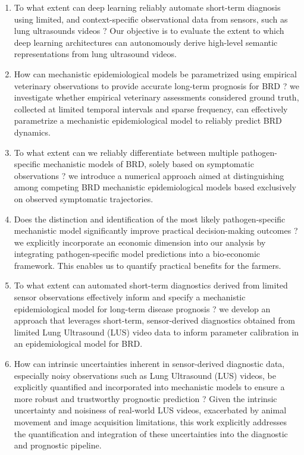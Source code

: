 \begin{enumerate}
    \item To what extent can deep learning reliably automate short-term diagnosis using limited, and context-specific observational data from sensors, such as lung ultrasounds videos ? Our objective is to evaluate the extent to which deep learning architectures can autonomously derive high-level semantic representations from lung ultrasound videos.
    
    \item How can mechanistic epidemiological models be parametrized using empirical veterinary observations to provide accurate long-term prognosis for BRD ?  we investigate whether empirical veterinary assessments considered ground truth, collected at limited temporal intervals and sparse frequency, can effectively parametrize a mechanistic epidemiological model to reliably predict BRD dynamics. 

    \item To what extent can we reliably differentiate between multiple pathogen-specific mechanistic models of BRD, solely based on symptomatic observations ? we introduce a numerical approach aimed at distinguishing among competing BRD mechanistic epidemiological models based exclusively on observed symptomatic trajectories. 

    \item Does the distinction and identification of the most likely pathogen-specific mechanistic model significantly improve practical decision-making outcomes ? we explicitly incorporate an economic dimension into our analysis by integrating pathogen-specific model predictions into a bio-economic framework. This enables us to quantify practical benefits for the farmers. 

    \item To what extent can automated short-term diagnostics derived from limited sensor observations effectively inform and specify a mechanistic epidemiological model for long-term disease prognosis ? we develop an approach that leverages short-term, sensor-derived diagnostics obtained from limited Lung Ultrasound (LUS) video data to inform parameter calibration in an epidemiological model for BRD. 

    \item How can intrinsic uncertainties inherent in sensor-derived diagnostic data, especially noisy observations such as Lung Ultrasound (LUS) videos, be explicitly quantified and incorporated into mechanistic models to ensure a more robust and trustworthy prognostic prediction ? Given the intrinsic uncertainty and noisiness of real-world LUS videos, exacerbated by animal movement and image acquisition limitations, this work explicitly addresses the quantification and integration of these uncertainties into the diagnostic and prognostic pipeline.
\end{enumerate}





